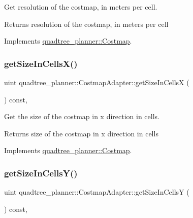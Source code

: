 Get resolution of the costmap, in meters per cell. 

\begin{DoxyReturn}{Returns}
resolution of the costmap, in meters per cell 
\end{DoxyReturn}


Implements \hyperlink{classquadtree__planner_1_1Costmap_aaef2845def8e7320a7fa576e9efab289}{quadtree\+\_\+planner\+::\+Costmap}.

\mbox{\label{classquadtree__planner_1_1CostmapAdapter_a376b9bddbf47474be992170d06e008d7}} 
\subsubsection{\texorpdfstring{get\+Size\+In\+Cells\+X()}{getSizeInCellsX()}}
{\footnotesize\ttfamily uint quadtree\+\_\+planner\+::\+Costmap\+Adapter\+::get\+Size\+In\+CellsX (\begin{DoxyParamCaption}{ }\end{DoxyParamCaption}) const\hspace{0.3cm}{\ttfamily [override]}, {\ttfamily [virtual]}}



Get the size of the costmap in x direction in cells. 

\begin{DoxyReturn}{Returns}
size of the costmap in x direction in cells 
\end{DoxyReturn}


Implements \hyperlink{classquadtree__planner_1_1Costmap_aa78086776637e7472d5ca8ae44f5c2f0}{quadtree\+\_\+planner\+::\+Costmap}.

\mbox{\label{classquadtree__planner_1_1CostmapAdapter_a7d54b4b74b3057018408550c1116066e}} 
\subsubsection{\texorpdfstring{get\+Size\+In\+Cells\+Y()}{getSizeInCellsY()}}
{\footnotesize\ttfamily uint quadtree\+\_\+planner\+::\+Costmap\+Adapter\+::get\+Size\+In\+CellsY (\begin{DoxyParamCaption}{ }\end{DoxyParamCaption}) const\hspace{0.3cm}{\ttfamily [override]}, {\ttfamily [virtual]}}



